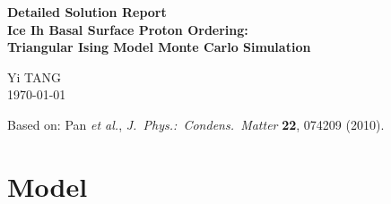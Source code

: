 \documentclass[12pt, a4paper]{article}
\theoremstyle{definition}
\newcommand{\COH}{C_\mathrm{OH}^B}
\newcommand{\Eeps}{\varepsilon}
\newcommand{\Nocc}{N_\mathrm{occ}}
\newcommand{\avgE}[1]{\langle #1 \rangle}
\begin{document}

\begin{titlepage}
    \centering
    \vspace*{2cm}

    {\LARGE \bfseries Detailed Solution Report}\\[1em]
    {\large \bfseries Ice Ih Basal Surface Proton Ordering:\\
    Triangular Ising Model Monte Carlo Simulation}

    \vspace{1.5cm}
    {\large Yi TANG}\\[0.5em]
    {\normalsize \today}

    \vspace{2cm}

    \vfill
    \small Based on: Pan \textit{et al.}, \textit{J.\ Phys.:\ Condens.\ Matter}
    \textbf{22}, 074209 (2010).
\end{titlepage}

\tableofcontents
\newpage




\section{Model}
\label{sec:model}
\end{document}
